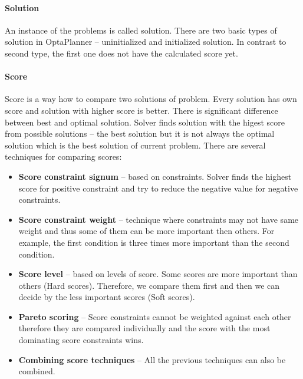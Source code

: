 \paragraph{Solution}
An instance of the problems is called solution. There are two basic types of solution in OptaPlanner -- uninitialized and initialized solution. In contrast to second type, the first one does not have the calculated score yet.

\paragraph{Score}\label{score}
Score is a way how to compare two solutions of problem. Every solution has own score and solution with higher score is better. There is significant difference between best and optimal solution. Solver finds solution with the higest score from possible solutions -- the best solution but it is not always the optimal solution which is the best solution of current problem. There are several techniques for comparing scores:
\begin{itemize}
\item \textbf{Score constraint signum} -- based on constraints. Solver finds the highest score for positive constraint and try to reduce the negative value for negative constraints.
\item \textbf{Score constraint weight} -- technique where constraints may not have same weight and thus some of them can be more important then others. For example, the first condition is three times more important than the second condition.
\item \textbf{Score level} -- based on levels of score. Some scores are more important than others (Hard scores). Therefore, we compare them first and then we can decide by the less important scores (Soft scores).
\item \textbf{Pareto scoring} -- Score constraints cannot be weighted against each other therefore they are compared individually and the score with the most dominating score constraints wins.
\item \textbf{Combining score techniques} -- All the previous techniques can also be combined.
\end{itemize}

